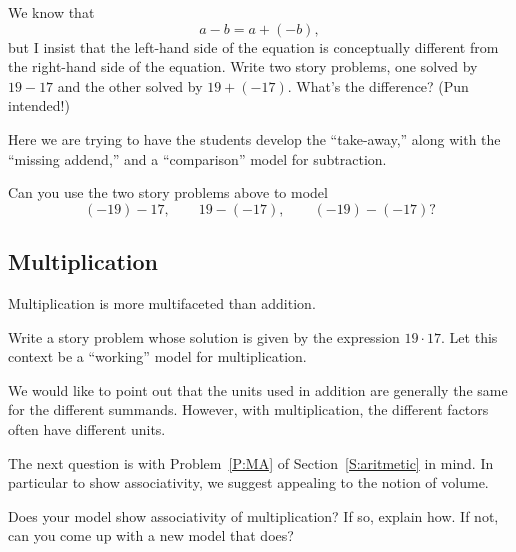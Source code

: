 \begin{question}
We know that 
\[
a - b  = a + (-b),
\]
but I insist that the left-hand side of the equation is conceptually
different from the right-hand side of the equation. Write two story
problems, one solved by $19-17$ and the other solved by
$19+(-17)$. What's the difference? (Pun intended!)
\end{question}
\QM

\begin{teachingnote}
Here we are trying to have the students develop the ``take-away,''
along with the ``missing addend,'' and a ``comparison'' model for
subtraction.
\end{teachingnote}


\begin{question}
Can you use the two story problems above to model
\[
(-19)-17, \qquad  19 - (-17), \qquad (-19) - (-17)?
\]
\end{question}
\QM

\subsection{Multiplication}


Multiplication is more multifaceted than addition. 

\begin{question}
Write a story problem whose solution is given by the expression
$19\cdot 17$. Let this context be a ``working'' model for multiplication. 
\end{question}
\QM

\begin{teachingnote}
We would like to point out that the units used in addition are generally
the same for the different summands. However, with multiplication, the
different factors often have different units.
\end{teachingnote}



\begin{teachingnote}
The next question is with Problem~\ref{P:MA} of
Section~\ref{S:aritmetic} in mind. In particular to show
associativity, we suggest appealing to the notion of volume.
\end{teachingnote}

\begin{question}
Does your model show associativity of multiplication? If so, explain
how. If not, can you come up with a new model that does?
\end{question}
\QM

